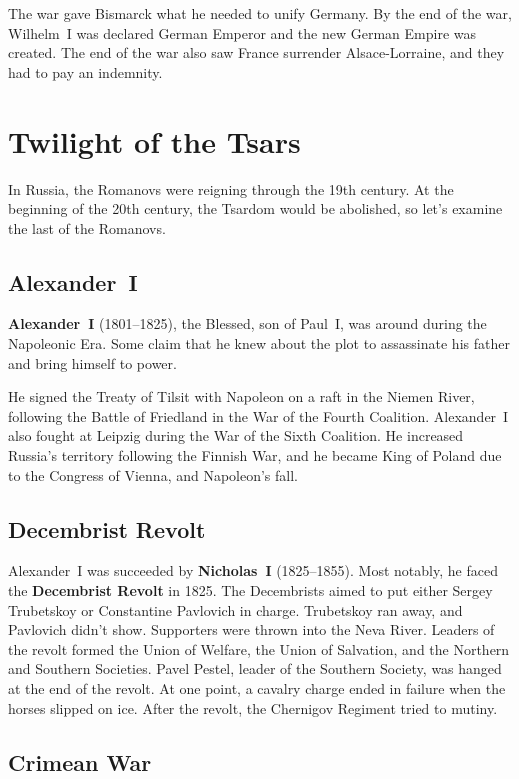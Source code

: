 The war gave Bismarck what he needed to unify Germany.
By the end of the war, Wilhelm~I was declared German Emperor and the new German Empire was created.
The end of the war also saw France surrender Alsace-Lorraine, and they had to pay an indemnity.

\section{Twilight of the Tsars}

In Russia, the Romanovs were reigning through the 19th century.
At the beginning of the 20th century, the Tsardom would be abolished, so let's examine the last of the Romanovs.

\subsection*{Alexander~I}

\textbf{Alexander~I} (1801--1825), the Blessed, son of Paul~I, was around during the Napoleonic Era.
Some claim that he knew about the plot to assassinate his father and bring himself to power.

He signed the Treaty of Tilsit with Napoleon on a raft in the Niemen River,
following the Battle of Friedland in the War of the Fourth Coalition.
Alexander~I also fought at Leipzig during the War of the Sixth Coalition.
He increased Russia's territory following the Finnish War,
and he became King of Poland due to the Congress of Vienna, and Napoleon's fall.

\subsection*{Decembrist Revolt}

Alexander~I was succeeded by \textbf{Nicholas~I} (1825--1855).
Most notably, he faced the \textbf{Decembrist Revolt} in 1825.
The Decembrists aimed to put either Sergey Trubetskoy or Constantine Pavlovich in charge.
Trubetskoy ran away, and Pavlovich didn't show.
Supporters were thrown into the Neva River.
Leaders of the revolt formed the Union of Welfare, the Union of Salvation, and the Northern and Southern Societies.
Pavel Pestel, leader of the Southern Society, was hanged at the end of the revolt.
At one point, a cavalry charge ended in failure when the horses slipped on ice.
After the revolt, the Chernigov Regiment tried to mutiny.

\subsection*{Crimean War}


